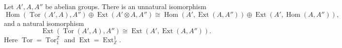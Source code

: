 Let $A', A, A''$ be abelian groups. There is an unnatural isomorphism
$$\operatorname{Hom}(\operatorname{Tor}(A', A), A'') \oplus \operatorname{Ext}(A' \otimes A, A'') \cong \operatorname{Hom}(A', \operatorname{Ext}(A, A'')) \oplus \operatorname{Ext}(A', \operatorname{Hom}(A, A'')),$$
and a natural isomorphism
$$\operatorname{Ext}(\operatorname{Tor}(A', A), A'') \cong \operatorname{Ext}(A', \operatorname{Ext}(A, A'')).$$
Here $\operatorname{Tor} = \operatorname{Tor}_1^{\mathbb{Z}}$ and $\operatorname{Ext} = \operatorname{Ext}_{\mathbb{Z}}^1$.
